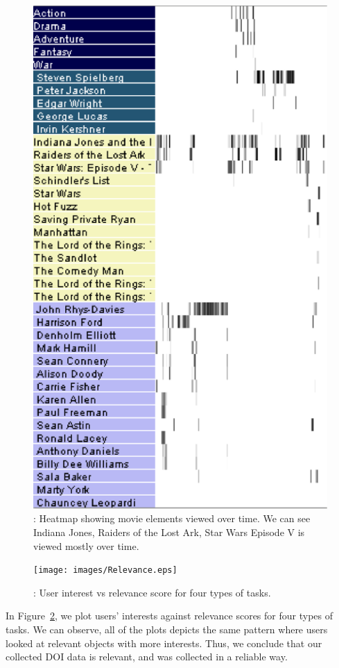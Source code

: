 \begin{figure}[htb]
  \centering
  \includegraphics[width=0.6\linewidth]{images/heatmap.eps}
  \caption{: Heatmap showing movie elements viewed over time. We can see Indiana Jones, Raiders of the Lost Ark, Star Wars Episode V is viewed mostly over time. }
	\label{fig:heatmap}
\end{figure}

\begin{figure}[htb]
  \centering
  \texttt{[image: images/Relevance.eps]}
  \caption{: User interest vs relevance score for four types of tasks. }
	\label{fig:Relevance}
\end{figure}

In Figure~\ref{fig:Relevance}, we plot users' interests against relevance scores for four types of tasks. We can observe, all of the plots depicts the same pattern where users looked at relevant objects with more interests. Thus, we conclude that our collected DOI data is relevant, and was collected in a reliable way.  
